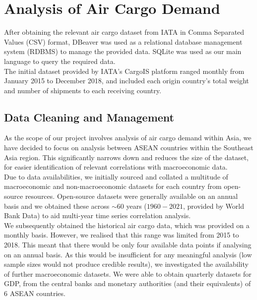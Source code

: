 \documentclass{article}
\begin{document}
\section{Analysis of Air Cargo Demand}

After obtaining the relevant air cargo dataset from IATA in Comma Separated Values (CSV) format, DBeaver was used as a relational database management system (RDBMS) to manage the provided data. SQLite was used as our main language to query the required data. \\

\noindent The initial dataset provided by IATA's CargoIS platform ranged monthly from January 2015 to December 2018, and included each origin country's total weight and number of shipments to each receiving country.


\subsection{Data Cleaning and Management}

As the scope of our project involves analysis of air cargo demand within Asia, we have decided to focus on analysis between ASEAN countries within the Southeast Asia region. This significantly narrows down and reduces the size of the dataset, for easier identification of relevant correlations with macroeconomic data. \\

\noindent Due to data availabilities, we initially sourced and collated a multitude of macroeconomic and non-macroeconomic datasets for each country from open-source resources. Open-source datasets were generally available on an annual basis and we obtained these across $\sim60$ years ($1960 - 2021$, provided by World Bank Data) to aid multi-year time series correlation analysis. \\

\noindent We subsequently obtained the historical air cargo data, which was provided on a monthly basis. However, we realised that this range was limited from 2015 to 2018. This meant that there would be only four available data points if analysing on an annual basis. As this would be insufficient for any meaningful analysis (low sample sizes would not produce credible results), we investigated the availability of further macroeconomic datasets. We were able to obtain quarterly datasets for GDP, from the central banks and monetary authorities (and their equivalents) of 6 ASEAN countries. \\
\end{document}
